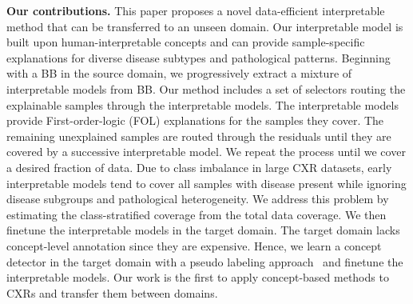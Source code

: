 \textbf{Our contributions.}
This paper proposes a novel data-efficient interpretable method that can be transferred to an unseen domain. Our interpretable model is built upon human-interpretable concepts and can provide sample-specific explanations for diverse disease subtypes and pathological patterns. Beginning with a BB in the source domain, we progressively extract a mixture of interpretable models from BB. Our method includes a set of selectors routing the explainable samples through the interpretable models. The interpretable models provide First-order-logic (FOL) explanations for the samples they cover. The remaining unexplained samples are routed through the residuals until they are covered by a successive interpretable model. We repeat the process until we cover a desired fraction of data. Due to class imbalance in large CXR datasets, early interpretable models tend to cover all samples with disease present while ignoring disease subgroups and pathological heterogeneity. We address this problem by estimating the class-stratified coverage from the total data coverage. We then finetune the interpretable models in the target domain. The target domain lacks concept-level annotation since they are expensive. Hence, we learn a concept detector in the target domain with a pseudo labeling approach~\cite{lee2013pseudo} and finetune the interpretable models. Our work is the first to apply concept-based methods to CXRs and transfer them between domains. 

 
